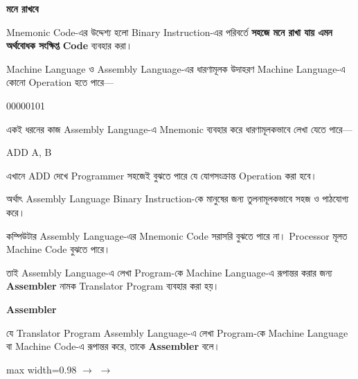 \begin{rememberbox}
\textbf{\color{deepOrange}মনে রাখবে}

Mnemonic Code-এর উদ্দেশ্য হলো Binary Instruction-এর পরিবর্তে \textbf{সহজে মনে রাখা যায় এমন অর্থবোধক সংক্ষিপ্ত Code} ব্যবহার করা।
\end{rememberbox}

\begin{examplebox}{Machine Language ও Assembly Language-এর ধারণামূলক উদাহরণ}
Machine Language-এ কোনো Operation হতে পারে—
\begin{center}
{\large\textenglish{ 00000101}}
\end{center}
একই ধরনের কাজ Assembly Language-এ Mnemonic ব্যবহার করে ধারণামূলকভাবে লেখা যেতে পারে—
\begin{center}
{\large\textenglish{\ttfamily ADD A, B}}
\end{center}
এখানে \textenglish{\ttfamily ADD} দেখে Programmer সহজেই বুঝতে পারে যে যোগসংক্রান্ত Operation করা হবে।

অর্থাৎ Assembly Language Binary Instruction-কে মানুষের জন্য তুলনামূলকভাবে সহজ ও পাঠযোগ্য করে।
\end{examplebox}

কম্পিউটার Assembly Language-এর Mnemonic Code সরাসরি বুঝতে পারে না। Processor মূলত Machine Code বুঝতে পারে।

তাই Assembly Language-এ লেখা Program-কে Machine Language-এ রূপান্তর করার জন্য \textbf{Assembler} নামক Translator Program ব্যবহার করা হয়।

\begin{definitionbox}
\textbf{\color{darkTeal}Assembler}

যে Translator Program Assembly Language-এ লেখা Program-কে Machine Language বা Machine Code-এ রূপান্তর করে, তাকে \textbf{Assembler} বলে।
\end{definitionbox}

\begin{center}
\begin{adjustbox}{max width=0.98\linewidth}
\hspace{2mm}\(\longrightarrow\)\hspace{2mm}
\hspace{2mm}\(\longrightarrow\)\hspace{2mm}
\end{adjustbox}
\end{center}

